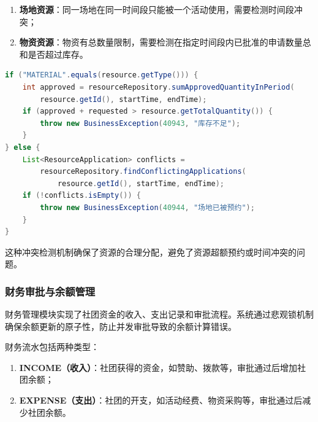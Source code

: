 \begin{enumerate}
  \item \textbf{场地资源}：同一场地在同一时间段只能被一个活动使用，需要检测时间段冲突；

  \item \textbf{物资资源}：物资有总数量限制，需要检测在指定时间段内已批准的申请数量总和是否超过库存。
\end{enumerate}

\begin{lstlisting}[language=Java, caption=资源可用性校验（节选）]
if ("MATERIAL".equals(resource.getType())) {
    int approved = resourceRepository.sumApprovedQuantityInPeriod(
        resource.getId(), startTime, endTime);
    if (approved + requested > resource.getTotalQuantity()) {
        throw new BusinessException(40943, "库存不足");
    }
} else {
    List<ResourceApplication> conflicts =
        resourceRepository.findConflictingApplications(
            resource.getId(), startTime, endTime);
    if (!conflicts.isEmpty()) {
        throw new BusinessException(40944, "场地已被预约");
    }
}
\end{lstlisting}

这种冲突检测机制确保了资源的合理分配，避免了资源超额预约或时间冲突的问题。

\subsubsection{财务审批与余额管理}

财务管理模块实现了社团资金的收入、支出记录和审批流程。系统通过悲观锁机制确保余额更新的原子性，防止并发审批导致的余额计算错误。

财务流水包括两种类型：

\begin{enumerate}
  \item \textbf{INCOME（收入）}：社团获得的资金，如赞助、拨款等，审批通过后增加社团余额；

  \item \textbf{EXPENSE（支出）}：社团的开支，如活动经费、物资采购等，审批通过后减少社团余额。
\end{enumerate}

